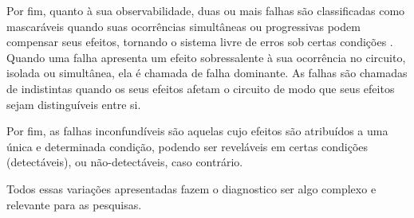 Por fim, quanto à sua observabilidade, duas ou mais falhas são classificadas como mascaráveis quando suas ocorrências simultâneas ou progressivas podem compensar seus efeitos, tornando o sistema livre de erros sob certas condições \cite{lombardi}. Quando uma falha apresenta um efeito sobressalente à sua ocorrência no circuito, isolada ou simultânea, ela é chamada de falha dominante. As falhas são chamadas de indistintas quando os seus efeitos afetam o circuito de modo que seus efeitos sejam distinguíveis entre si.

Por fim, as falhas inconfundíveis são aquelas cujo efeitos são atribuídos a uma única e determinada condição, podendo ser reveláveis em certas condições (detectáveis), ou não-detectáveis, caso contrário.

Todos essas variações apresentadas fazem o diagnostico ser algo complexo e relevante para as pesquisas. 




